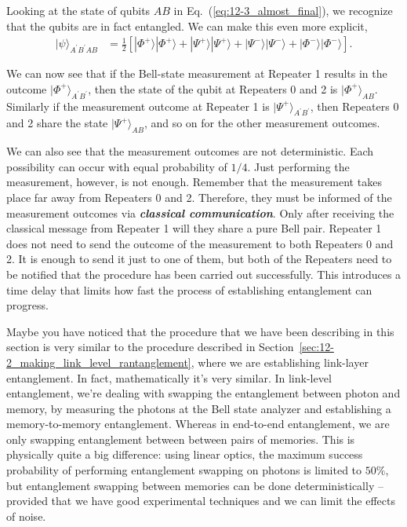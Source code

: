 Looking at the state of qubits $AB$ in Eq.~(\ref{eq:12-3_almost_final}), we recognize that the qubits are in fact entangled.
We can make this even more explicit,
\begin{align}
    |\psi\rangle_{A^{\prime}B^{\prime}AB} & = \frac{1}{2} \left[ |\Phi^+\rangle |\Phi^+\rangle + |\Psi^+\rangle |\Psi^+\rangle + |\Psi^-\rangle |\Psi^-\rangle + |\Phi^-\rangle |\Phi^-\rangle \right].
    \label{eq:12-3_final}
\end{align}

We can now see that if the Bell-state measurement at Repeater 1 results in the outcome $|\Phi^+\rangle_{A^{\prime}B^{\prime}}$, then the state of the qubit at Repeaters 0 and 2 is $|\Phi^+\rangle_{AB}$.
Similarly if the measurement outcome at Repeater 1 is $|\Psi^+\rangle_{A^{\prime}B^{\prime}}$, then Repeaters 0 and 2 share the state $|\Psi^+\rangle_{AB}$, and so on for the other measurement outcomes.

We can also see that the measurement outcomes are not deterministic.
Each possibility can occur with equal probability of $1/4$.
Just performing the measurement, however, is not enough.
Remember that the measurement takes place far away from Repeaters 0 and 2.
Therefore, they must be informed of the measurement outcomes via \textit{\textbf{classical communication}}.
Only after receiving the classical message from Repeater 1 will they share a pure Bell pair.
Repeater 1 does not need to send the outcome of the measurement to both Repeaters 0 and 2.
It is enough to send it just to one of them, but both of the Repeaters need to be notified that the procedure has been carried out successfully.
This introduces a time delay that limits how fast the process of establishing entanglement can progress.

Maybe you have noticed that the procedure that we have been describing in this section is very similar to the procedure described in Section~\ref{sec:12-2_making_link_level_rantanglement}, where we are establishing link-layer entanglement.
In fact, mathematically it's very similar.
In link-level entanglement, we're dealing with swapping the entanglement between photon and memory, by measuring the photons at the Bell state analyzer and establishing a memory-to-memory entanglement.
Whereas in end-to-end entanglement, we are only swapping entanglement between between pairs of memories.
This is physically quite a big difference: using linear optics, the maximum success probability of performing entanglement swapping on photons is limited to $50\%$, but entanglement swapping between memories can be done deterministically -- provided that we have good experimental techniques and we can limit the effects of noise.

